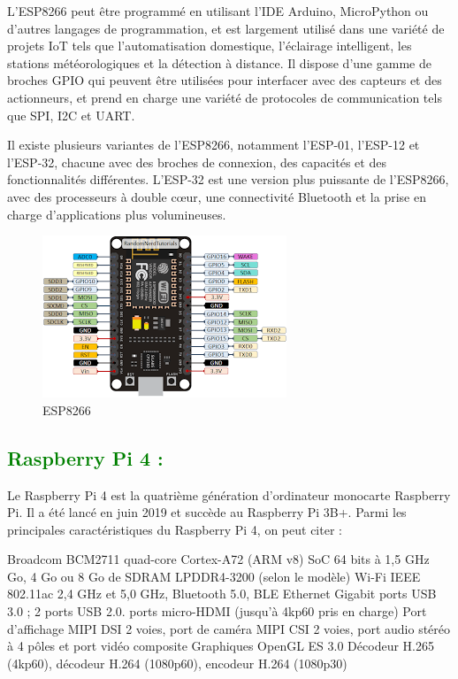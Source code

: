 \begin{flushleft}
	L'ESP8266 peut être programmé en utilisant l'IDE Arduino, MicroPython ou d'autres langages de programmation, et est largement utilisé dans une variété de projets IoT tels que l'automatisation domestique, l'éclairage intelligent, les stations météorologiques et la détection à distance. Il dispose d'une gamme de broches GPIO qui peuvent être utilisées pour interfacer avec des capteurs et des actionneurs, et prend en charge une variété de protocoles de communication tels que SPI, I2C et UART.
	
	Il existe plusieurs variantes de l'ESP8266, notamment l'ESP-01, l'ESP-12 et l'ESP-32, chacune avec des broches de connexion, des capacités et des fonctionnalités différentes. L'ESP-32 est une version plus puissante de l'ESP8266, avec des processeurs à double cœur, une connectivité Bluetooth et la prise en charge d'applications plus volumineuses.
	\begin{figure}[h]
		\centering
		\includegraphics{chapitres/images/esp8266.png}
		\caption{ESP8266}
		\label{fig:labelname}
	\end{figure}
  	\newpage
	\subsection{\textcolor{green}{Raspberry Pi 4 :}}
	Le Raspberry Pi 4 est la quatrième génération d'ordinateur monocarte Raspberry Pi. Il a été lancé en juin 2019 et succède au Raspberry Pi 3B+. Parmi les principales caractéristiques du Raspberry Pi 4, on peut citer :
	
	Broadcom BCM2711 quad-core Cortex-A72 (ARM v8) SoC 64 bits à 1,5 GHz  Go, 4 Go ou 8 Go de SDRAM LPDDR4-3200 (selon le modèle)\newline
	Wi-Fi IEEE 802.11ac 2,4 GHz et 5,0 GHz, Bluetooth 5.0, BLE\newline
	Ethernet Gigabit ports USB 3.0 ; 2 ports USB 2.0. ports micro-HDMI (jusqu'à 4kp60 pris en charge)\newline
	Port d'affichage MIPI DSI 2 voies, port de caméra MIPI CSI 2 voies, port audio stéréo à 4 pôles et port vidéo composite\newline
	Graphiques OpenGL ES 3.0\newline
	Décodeur H.265 (4kp60), décodeur H.264 (1080p60), encodeur H.264 (1080p30)\newline
	

\end{flushleft}

